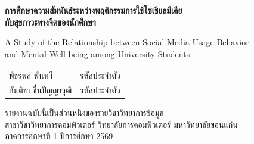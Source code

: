 \thispagestyle{empty}

\begin{center}
    {\fontsize{18pt}{22pt}\selectfont\bfseries
    การศึกษาความสัมพันธ์ระหว่างพฤติกรรมการใช้โซเชียลมีเดีย\\
    กับสุขภาวะทางจิตของนักศึกษา\par}

    \vspace{1em}

    {\fontsize{14pt}{18pt}\selectfont
    A Study of the Relationship between Social Media Usage Behavior\\
    and Mental Well-being among University Students\par}

    \vfill

    \begin{tabular}{@{}l@{\qquad}l@{}}
        พัชรพล พันทวี         & รหัสประจำตัว \\[0.3em]
        กันติชา ชื่นปัญญาวุฒิ & รหัสประจำตัว \\
    \end{tabular}

    \vfill

    รายงานฉบับนี้เป็นส่วนหนึ่งของรายวิชาวิทยาการข้อมูล\\
    สาขาวิชาวิทยาการคอมพิวเตอร์ วิทยาลัยการคอมพิวเตอร์ มหาวิทยาลัยขอนแก่น\\
    ภาคการศึกษาที่ 1 ปีการศึกษา 2569
\end{center}

\clearpage
\restoregeometry
